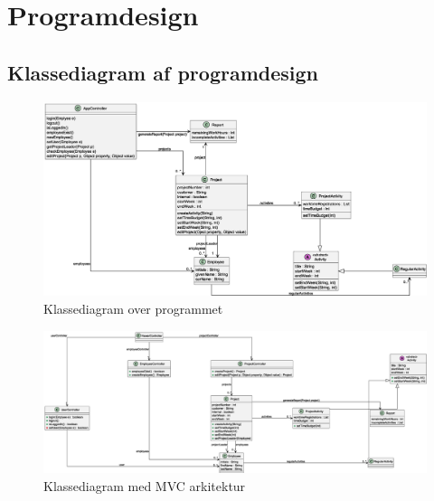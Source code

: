 \section{Programdesign}
\subsection{Klassediagram af programdesign}
\begin{figure}[H]
    \centering
    \caption{Klassediagram over programmet}\label{fig:ClassDiag}
    \includegraphics[width = \textwidth]{Diagrams/ClassDiagram.eps}
\end{figure}
\begin{figure}[H]
    \centering
    \caption{Klassediagram med MVC arkitektur}\label{fig:ClassDiagMVC}
    \includegraphics[width = \textwidth]{Diagrams/ClassDiagramMVC.eps}
\end{figure}
\newpage
